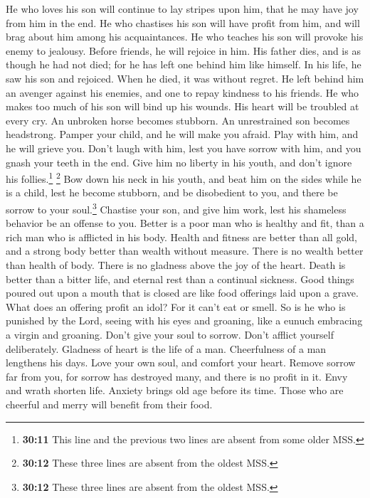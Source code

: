  He who loves his son will continue to lay stripes upon
him, that he may have joy from him in the end.  He who
chastises his son will have profit from him, and will brag about him
among his acquaintances.  He who teaches his son will
provoke his enemy to jealousy. Before friends, he will rejoice in him.
 His father dies, and is as though he had not died; for he
has left one behind him like himself.  In his life, he saw
his son and rejoiced. When he died, it was without regret.
 He left behind him an avenger against his enemies, and
one to repay kindness to his friends.  He who makes too
much of his son will bind up his wounds. His heart will be troubled at
every cry.  An unbroken horse becomes stubborn. An
unrestrained son becomes headstrong.  Pamper your child,
and he will make you afraid. Play with him, and he will grieve you.
 Don't laugh with him, lest you have sorrow with him, and
you gnash your teeth in the end.  Give him no liberty in
his youth, and don't ignore his follies.\footnote{\textbf{30:11} This
  line and the previous two lines are absent from some older MSS.}
 \footnote{\textbf{30:12} These three lines are absent
  from the oldest MSS.} Bow down his neck in his youth, and beat him on
the sides while he is a child, lest he become stubborn, and be
disobedient to you, and there be sorrow to your soul.\footnote{\textbf{30:12}
  These three lines are absent from the oldest MSS.} 
Chastise your son, and give him work, lest his shameless behavior be an
offense to you.  Better is a poor man who is healthy and
fit, than a rich man who is afflicted in his body. 
Health and fitness are better than all gold, and a strong body better
than wealth without measure.  There is no wealth better
than health of body. There is no gladness above the joy of the heart.
 Death is better than a bitter life, and eternal rest
than a continual sickness.  Good things poured out upon a
mouth that is closed are like food offerings laid upon a grave.
 What does an offering profit an idol? For it can't eat
or smell. So is he who is punished by the Lord,  seeing
with his eyes and groaning, like a eunuch embracing a virgin and
groaning.  Don't give your soul to sorrow. Don't afflict
yourself deliberately.  Gladness of heart is the life of
a man. Cheerfulness of a man lengthens his days.  Love
your own soul, and comfort your heart. Remove sorrow far from you, for
sorrow has destroyed many, and there is no profit in it. 
Envy and wrath shorten life. Anxiety brings old age before its time.
 Those who are cheerful and merry will benefit from their
food.

